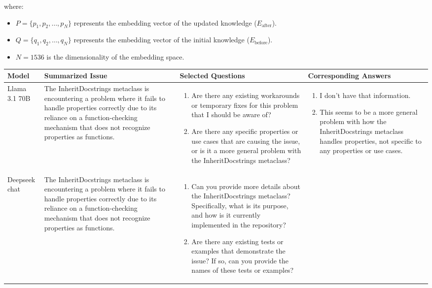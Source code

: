 \noindent where:
\begin{itemize}
    \item \( P = \{p_1, p_2, \dots, p_N\} \) represents the embedding vector of the updated knowledge (\(E_{\text{after}}\)).
    \item \( Q = \{q_1, q_2, \dots, q_N\} \) represents the embedding vector of the initial knowledge (\(E_{\text{before}}\)).
    \item \( N = 1536 \) is the dimensionality of the embedding space.
\end{itemize}
\begin{table*}[ht]
\centering
\begin{tabular}{p{1.5cm} p{4.0cm} p{5.0cm} p{5.5cm}}
\hline
\setlength{\extrarowheight}{-2pt} 

\textbf{Model} & \textbf{Summarized Issue} & \textbf{Selected Questions} & \textbf{Corresponding Answers} \\
\hline
 Llama 3.1 70B & The InheritDocstrings metaclass is encountering a problem where it fails to handle properties correctly due to its reliance on a function-checking mechanism that does not recognize properties as functions. & \begin{enumerate}
    \item Are there any existing workarounds or temporary fixes for this problem that I should be aware of?
    \item Are there any specific properties or use cases that are causing the issue, or is it a more general problem with the InheritDocstrings metaclass?
\end{enumerate}
& \begin{enumerate}
    \item I don't have that information.
    \item This seems to be a more general problem with how the InheritDocstrings metaclass handles properties, not specific to any properties or use cases.
\end{enumerate} \\
\hline
Deepseek chat & The InheritDocstrings metaclass is encountering a problem where it fails to handle properties correctly due to its reliance on a function-checking mechanism that does not recognize properties as functions. & \begin{enumerate}
    \item Can you provide more details about the InheritDocstrings metaclass? Specifically, what is its purpose, and how is it currently implemented in the repository?
    \item Are there any existing tests or examples that demonstrate the issue? If so, can you provide the names of these tests or examples?


\end{enumerate}
\end{tabular}
\end{table*}
